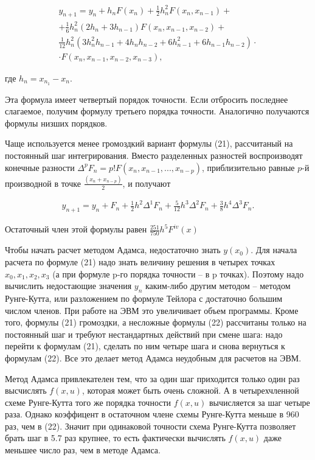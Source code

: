 \documentclass[a4paper,14pt]{article}
\begin{document}
\begin{eqnarray}
	y_{n+1} = y_n + h_n F(x_n) + \frac{1}{2} h_n^2 F(x_n, x_{n-1}) + \nonumber \\
	+ \frac{1}{6} h_n^2 (2h_n + 3h_{n-1}) F(x_n, x_{n-1}, x_{n-2}) + \nonumber \\
	\frac{1}{12} h_n^2 (3 h_n^2 h_{n-1} + 4 h_n h_{n-2} + 6 h_{n-1}^2 + 6 h_{n-1} h_{n-2}) \cdot \nonumber \\
	\cdot F(x_n, x_{n-1}, x_{n-2}, x_{n-3}),
\end{eqnarray}

где $h_n = x_{n_1} - x_n$.

Эта формула имеет четвертый порядок точности. Если отбросить последнее слагаемое,
получим формулу третьего порядка точности. Аналогично получаются формулы
низших порядков.

Чаще используется менее громоздкий вариант формулы (21), рассчитаный
на постоянный шаг интегрирования. Вместо разделенных разностей воспроизводят
конечные разности $\Delta^p F_n = p! F(x_n, x_{n-1}, ..., x_{n-p})$, приблизительно
равные $p$-й производной в точке $\frac{(x_n + x_{n-p})}{2}$, и получают

\begin{eqnarray}
	y_{n+1} = y_n + F_n+ \frac{1}{2} h^2 \Delta^1 F_n + \frac{5}{12} h^3 \Delta^2 F_n + \frac{3}{8} h^4 \Delta^3 F_n.
\end{eqnarray}

Остаточный член этой формулы равен $\frac{251}{750} h^5 F^{iv}(x)$

Чтобы начать расчет методом Адамса, недостаточно знать $y(x_0)$.
Для начала расчета по формуле (21) надо знать величину решения в четырех
точках $x_0, x_1, x_2, x_3$ (а при формуле p-го порядка точности -- в p точках).
Поэтому надо вычислить недостающие значения $y_n$ каким-либо другим
методом -- методом Рунге-Кутта, или разложением по формуле Тейлора с
достаточно большим числом членов. При работе на ЭВМ это увеличивает
объем программы. Кроме того, формулы (21) громоздки, а несложные формулы (22)
рассчитаны только на постоянный шаг и требуют нестандартных действий при
смене шага: надо перейти к формулам (21), сделать по ним четыре шага и снова
вернуться к формулам (22). Все это делает метод Адамса неудобным для расчетов на ЭВМ.

Метод Адамса привлекателен тем, что за один шаг приходится только один
раз высчислять $f(x, u)$, которая может быть очень сложной. А в 
четырехчленной схеме Рунге-Кутта того же порядка точности $f(x, u)$ вычисляется 
за шаг четыре раза. Однако коэффицент в остаточном члене схемы Рунге-Кутта меньше
в 960 раз, чем в (22). Значит при одинаковой точности схема Рунге-Кутта
позволяет брать шаг в 5.7 раз крупнее, то есть фактически вычислять 
$f(x, u)$ даже меньшее число раз, чем в методе Адамса.
\end{document}

